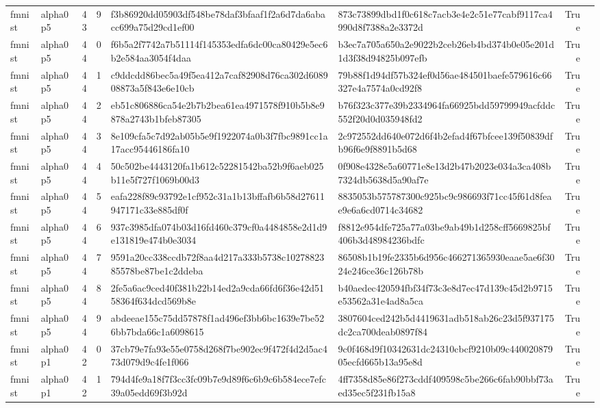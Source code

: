 \begin{tabular}{llrrllrl}
fmnist & alpha0p5 & 43 & 9 & f3b86920dd05903df548be78daf3bfaaf1f2a6d7da6abacc699a75d29cd1ef00 & 873c73899dbd1f0c618c7acb3e4e2c51e77cabf9117ca4990d8f7388a2e3372d & True &  \\
fmnist & alpha0p5 & 44 & 0 & f6b5a2f7742a7b51114f145353edfa6dc00ca80429e5ec6b2e584aa3054f4daa & b3ec7a705a650a2e9022b2ceb26eb4bd374b0e05e201d1d3f38d94825b097efb & True &  \\
fmnist & alpha0p5 & 44 & 1 & c9ddcdd86bec5a49f5ea412a7caf82908d76ca302d608908873a5f843e6e10cb & 79b88f1d94df57b324ef0d56ae484501baefe579616c66327e4a7574a0cd92f8 & True &  \\
fmnist & alpha0p5 & 44 & 2 & eb51c806886ca54e2b7b2bea61ea4971578f910b5b8e9878a2743b1bfeb87305 & b76f323c377e39b2334964fa66925bdd59799949acfddc552f20d0d035948fd2 & True &  \\
fmnist & alpha0p5 & 44 & 3 & 8e109cfa5c7d92ab05b5e9f1922074a0b3f7fbc9891cc1a17acc95446186fa10 & 2c972552dd640e072d6f4b2efad4f67bfcee139f50839dfb96f6e9f8891b5d68 & True &  \\
fmnist & alpha0p5 & 44 & 4 & 50c502be4443120fa1b612c52281542ba52b9f6aeb025b11e5f727f1069b00d3 & 0f908e4328e5a60771e8e13d2b47b2023e034a3ca408b7324db5638d5a90af7e & True &  \\
fmnist & alpha0p5 & 44 & 5 & eafa228f89c93792e1cf952c31a1b13bffafb6b58d27611947171c33e885df0f & 8835053b575787300c925bc9c986693f71cc45f61d8feae9e6a6cd0714c34682 & True &  \\
fmnist & alpha0p5 & 44 & 6 & 937c3985dfa074b03d16fd460c379cf0a4484858e2d1d9e131819e474b0e3034 & f8812e954dfe725a77a03be9ab49b1d258cff5669825bf406b3d48984236bdfc & True &  \\
fmnist & alpha0p5 & 44 & 7 & 9591a20cc338ccdb72f8aa4d217a333b5738c1027882385578be87be1c2ddeba & 86508b1b19fe2335b6d956c466271365930eaae5ae6f3024e246ce36c126b78b & True &  \\
fmnist & alpha0p5 & 44 & 8 & 2fe5a6ac9ced40f381b22b14ed2a9cda66fd6f36e42d5158364f634dcd569b8e & b40aedec420594fbf34f73c3e8d7ec47d139c45d2b9715e53562a31e4ad8a5ca & True &  \\
fmnist & alpha0p5 & 44 & 9 & abdeeae155c75dd57878f1ad496ef3bb6bc1639e7be526bb7bda66c1a6098615 & 3807604ced242b5d4419631adb518ab26c23d5f937175dc2ca700deab0897f84 & True &  \\
fmnist & alpha0p1 & 42 & 0 & 37cb79e7fa93e55e0758d268f7be902ec9f472f4d2d5ac473d079d9c4fe1f066 & 9c0f468d9f10342631dc24310cbcf9210b09c44002087905ecfd665b13a95e8d & True &  \\
fmnist & alpha0p1 & 42 & 1 & 794d4fe9a18f7f3cc3fc09b7e9d89f6c6b9c6b584ece7efc39a05edd69f3b92d & 4ff7358d85e86f273cddf409598c5be266c6fab90bbf73aed35ec5f231fb15a8 & True &  \\

\end{tabular}
